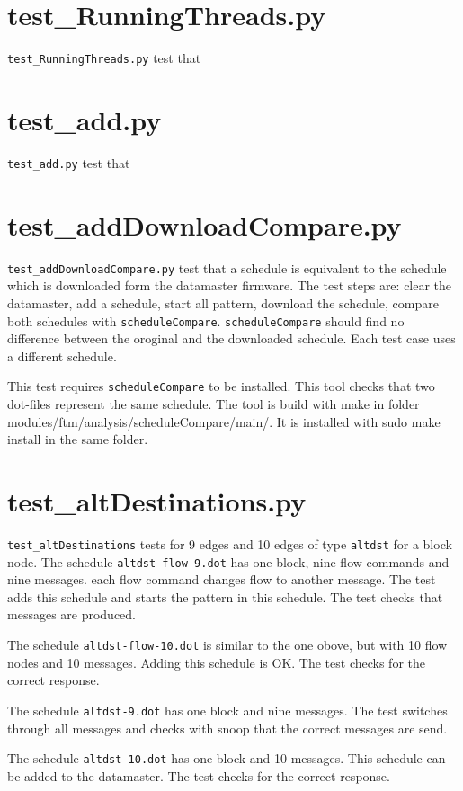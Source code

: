 \documentclass[12pt,a4paper]{report}
\begin{document}
\section{test\_RunningThreads.py}
\texttt{test\_RunningThreads.py} test that

\section{test\_add.py}
\texttt{test\_add.py} test that

\section{test\_addDownloadCompare.py}
\texttt{test\_addDownloadCompare.py} test that a schedule is equivalent
to the schedule which is downloaded form the datamaster firmware.
The test steps are: clear the datamaster, add a schedule, start all
pattern, download the schedule, compare both schedules with
\texttt{scheduleCompare}. \texttt{scheduleCompare} should find no difference
between the oroginal and the downloaded schedule. Each test case uses a
different schedule.

This test requires \texttt{scheduleCompare} to be installed. This tool
checks that two dot-files represent the same schedule. The tool is build
with make in folder modules/ftm/analysis/scheduleCompare/main/.
It is installed with sudo make install in the same folder.

\section{test\_altDestinations.py}
\texttt{test\_altDestinations} tests for 9 edges and 10 edges of type
\texttt{altdst} for a block node.
The schedule \texttt{altdst-flow-9.dot} has one block, nine flow commands
and nine messages. each flow command changes flow to another message.
The test adds this schedule and starts the pattern in this schedule.
The test checks that messages are produced.

The schedule \texttt{altdst-flow-10.dot} is similar to the one obove,
but with 10 flow nodes and 10 messages. Adding this schedule is OK.
The test checks for the correct response.

The schedule \texttt{altdst-9.dot} has one block and nine messages.
The test switches through all messages and checks with snoop that the
correct messages are send.

The schedule \texttt{altdst-10.dot} has one block and 10 messages.
This schedule can be added to the datamaster. The test checks for
the correct response.
\end{document}
